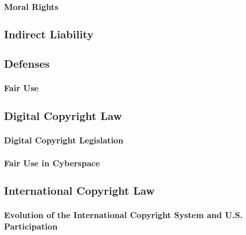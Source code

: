 
\subsubsection{Moral Rights}


\subsection{Indirect Liability}


\subsection{Defenses}


\subsubsection{Fair Use}



\subsection{Digital Copyright Law}

\subsubsection{Digital Copyright Legislation}


\subsubsection{Fair Use in Cyberspace}


\subsection{International Copyright Law}

\subsubsection{Evolution of the International Copyright System and U.S. 
Participation}

